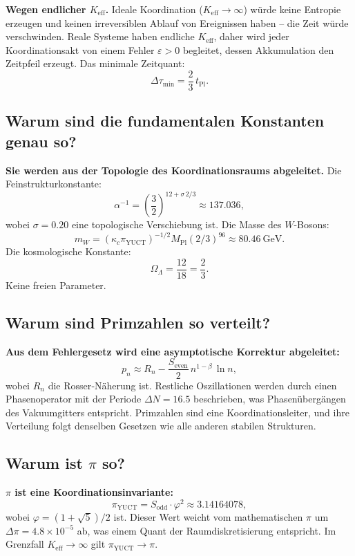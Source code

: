 \documentclass[12pt,a4paper]{article}
\newcommand{\Keff}{K_{\mathrm{eff}}}
\newcommand{\kappac}{\kappa_c}
\newcommand{\eps}{\varepsilon}
\newcommand{\betaf}{\beta}
\newcommand{\Sodd}{S_{\mathrm{odd}}}
\newcommand{\Seven}{S_{\mathrm{even}}}
\newcommand{\tPl}{t_{\mathrm{Pl}}}
\newcommand{\piYUCT}{\pi_{\mathrm{YUCT}}}
\begin{document}
	\textbf{Wegen endlicher \(\Keff\).} Ideale Koordination (\(\Keff \to \infty\)) würde keine Entropie erzeugen und keinen irreversiblen Ablauf von Ereignissen haben – die Zeit würde verschwinden. Reale Systeme haben endliche \(\Keff\), daher wird jeder Koordinationsakt von einem Fehler \(\eps > 0\) begleitet, dessen Akkumulation den Zeitpfeil erzeugt. Das minimale Zeitquant:
	\[
	\Delta \tau_{\min} = \frac{2}{3}\,\tPl.
	\]
	
	\subsection{Warum sind die fundamentalen Konstanten genau so?}
	
	\textbf{Sie werden aus der Topologie des Koordinationsraums abgeleitet.} Die Feinstrukturkonstante:
	\[
	\alpha^{-1} = \left(\frac{3}{2}\right)^{12 + \sigma\,2/3} \approx 137.036,
	\]
	wobei \(\sigma = 0.20\) eine topologische Verschiebung ist. Die Masse des \(W\)-Bosons:
	\[
	m_W = (\kappac \piYUCT)^{-1/2} M_{\mathrm{Pl}} (2/3)^{96} \approx 80.46\ \text{GeV}.
	\]
	Die kosmologische Konstante:
	\[
	\Omega_\Lambda = \frac{12}{18} = \frac{2}{3}.
	\]
	Keine freien Parameter.
	
	\subsection{Warum sind Primzahlen so verteilt?}
	
	\textbf{Aus dem Fehlergesetz wird eine asymptotische Korrektur abgeleitet:}
	\[
	p_n \approx R_n - \frac{\Seven}{2}\, n^{1-\betaf}\,\ln n,
	\]
	wobei \(R_n\) die Rosser‑Näherung ist. Restliche Oszillationen werden durch einen Phasenoperator mit der Periode \(\Delta N = 16.5\) beschrieben, was Phasenübergängen des Vakuumgitters entspricht. Primzahlen sind eine Koordinationsleiter, und ihre Verteilung folgt denselben Gesetzen wie alle anderen stabilen Strukturen.
	
	\subsection{Warum ist \(\pi\) so?}
	
	\textbf{\(\pi\) ist eine Koordinationsinvariante:}
	\[
	\piYUCT = \Sodd \cdot \varphi^2 \approx 3.14164078,
	\]
	wobei \(\varphi = (1+\sqrt{5})/2\) ist. Dieser Wert weicht vom mathematischen \(\pi\) um \(\Delta\pi = 4.8\times10^{-5}\) ab, was einem Quant der Raumdiskretisierung entspricht. Im Grenzfall \(\Keff \to \infty\) gilt \(\piYUCT \to \pi\).
	
\end{document}
